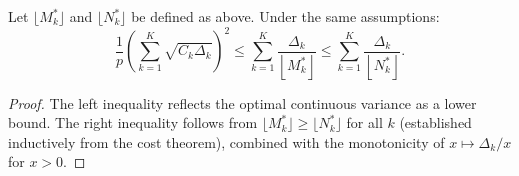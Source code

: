 \begin{theorem}
\label{thm:MFMC_IntegerValued_Variance_Bound}
Let $\lfloor M_k^* \rfloor$ and $\lfloor N_k^* \rfloor$ be defined as above. Under the same assumptions:
\[
\frac{1}{p}\left(\sum_{k=1}^K\sqrt{C_k\Delta_k}\right)^2
\le \sum_{k=1}^K \frac{\Delta_k}{\left\lfloor M_k^* \right\rfloor}
\le \sum_{k=1}^K \frac{\Delta_k}{\left\lfloor N_k^* \right\rfloor}.
\]
\end{theorem}
\begin{proof}
The left inequality reflects the optimal continuous variance as a lower bound. The right inequality follows from $\lfloor M_k^* \rfloor \geq \lfloor N_k^* \rfloor$ for all $k$ (established inductively from the cost theorem), combined with the monotonicity of $x \mapsto \Delta_k/x$ for $x > 0$.
\end{proof}







